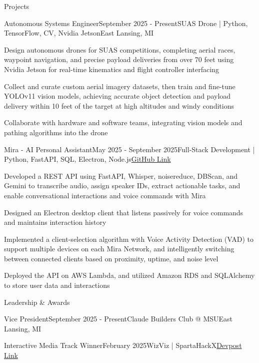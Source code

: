\documentclass[
	11pt
]{resume}
\begin{document}
	\begin{rSection}{P}{rojects}
		\begin{rSectionEntry}{Autonomous Systems Engineer}{September 2025 - Present}{SUAS Drone | Python, TensorFlow, CV, Nvidia Jetson}{East Lansing, MI}
			\item Design autonomous drones for SUAS competitions, completing aerial races, waypoint navigation, and precise payload deliveries from over 70 feet using Nvidia Jetson for real-time kinematics and flight controller interfacing
			\item Collect and curate custom aerial imagery datasets, then train and fine-tune YOLOv11 vision models, achieving accurate object detection and payload delivery within 10 feet of the target at high altitudes and windy conditions
			\item Collaborate with hardware and software teams, integrating vision models and pathing algorithms into the drone
		\end{rSectionEntry}


		\begin{rSectionEntry}{Mira - AI Personal Assistant}{May 2025 - September 2025}{Full-Stack Development | Python, FastAPI, SQL, Electron, Node.js}{\href{https://github.com/mira-assistant}{GitHub Link}}
			\item Developed a REST API using FastAPI, Whisper, noisereduce, DBScan, and Gemini to transcribe audio, assign speaker IDs, extract actionable tasks, and enable conversational interactions and voice commands with Mira
			\item Designed an Electron desktop client that listens passively for voice commands and maintains interaction history
			\item Implemented a client-selection algorithm with Voice Activity Detection (VAD) to support multiple devices on each Mira Network, and intelligently switching between connected clients based on proximity, uptime, and noise level
			\item Deployed the API on AWS Lambda, and utilized Amazon RDS and SQLAlchemy to store user data and interactions
		\end{rSectionEntry}
	\end{rSection}

	\begin{rSection}{L}{eadership \& Awards}
		\begin{rSectionEntryNoBullets}{Vice President}{September 2025 - Present}{Claude Builders Club @ MSU}{East Lansing, MI}
		\end{rSectionEntryNoBullets}

		\begin{rSectionEntryNoBullets}{Interactive Media Track Winner}{February 2025}{WizViz | SpartaHackX}{\href{https://devpost.com/software/wizviz}{Devpost Link}}
		\end{rSectionEntryNoBullets}
	\end{rSection}
\end{document}

